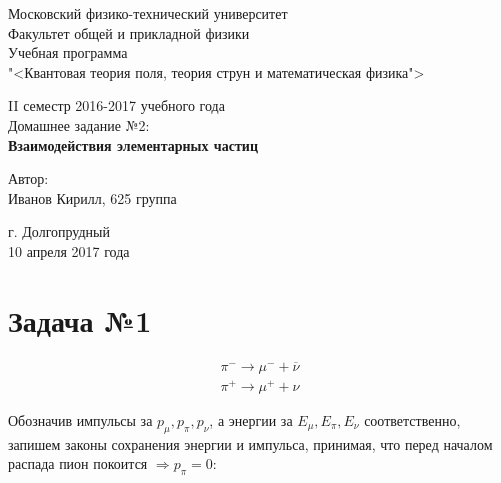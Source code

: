 \documentclass[12pt]{article}
\newcommand{\te}{\ensuremath{\Rightarrow}}
\newcommand{\st}{\ensuremath{\longrightarrow}}
\begin{document}
	
\begin{titlepage}		
\begin{center}
\large 	Московский физико-технический университет \\
Факультет общей и прикладной физики \\
\vspace{0.2cm}
Учебная программа\\
"<Квантовая теория поля, теория струн и математическая физика">

\vspace{4.5cm}
II семестр 2016-2017 учебного года \\ \vspace{0.1cm}
\large Домашнее задание №2: \\ \vspace{0.1cm}
\LARGE \textbf{Взаимодействия элементарных частиц}
\end{center}
\vspace{2.3cm} \large

\begin{center}
		 Автор: \\
 Иванов Кирилл,
 625 группа
\vspace{10mm}


\end{center}

\begin{center} \vspace{50mm}
г. Долгопрудный \\ 
10 апреля 2017 года
\end{center}
\end{titlepage}

\section{Задача №1}
\begin{equation}
\begin{aligned}
\pi^- \st \mu^- + \overline{\nu} \\
\pi^+ \st \mu^+ + \nu
\end{aligned}
\end{equation}

Обозначив импульсы за $ p_{\mu}, p_{\pi}, p_{\nu} $, а энергии за  $ E_{\mu}, E_{\pi}, E_{\nu} $ соответственно, запишем законы сохранения энергии и импульса, принимая, что перед началом распада пион покоится $ \te p_{\pi} = 0 $:
\end{document}

